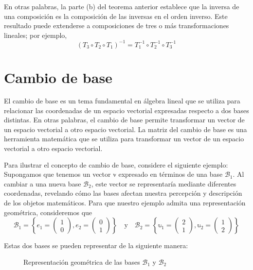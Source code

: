 En otras palabras, la parte (b) del teorema anterior establece que la inversa de una composición es la composición de las inversas en el orden inverso. Este resultado puede extenderse a composiciones de tres o más transformaciones lineales; por ejemplo,
$$(T_3 \circ T_2 \circ T_1)^{-1} = T_1^{-1} \circ T_2^{-1} \circ T_3^{-1}$$

\newpage

\section{Cambio de base}

El cambio de base es un tema fundamental en álgebra lineal que se utiliza para relacionar las coordenadas de un espacio vectorial expresadas respecto a dos bases distintas. En otras palabras, el cambio de base permite transformar un vector de un espacio vectorial a otro espacio vectorial. La matriz del cambio de base es una herramienta matemática que se utiliza para transformar un vector de un espacio vectorial a otro espacio vectorial.

Para ilustrar el concepto de cambio de base, considere el siguiente ejemplo: Supongamos que tenemos un vector $\mathbb{v}$ expresado en términos de una base $\mathcal{B}_1$. Al cambiar a una nueva base $\mathcal{B}_2$, este vector se representaría mediante diferentes coordenadas, revelando cómo las bases afectan nuestra percepción y descripción de los objetos matemáticos. Para que nuestro ejemplo admita una representación geométrica, consideremos que
$$\mathcal{B}_1 = \left\{ e_1 = \begin{pmatrix}
    1 \\
    0
\end{pmatrix},  e_2 = \begin{pmatrix}
    0 \\
    1
\end{pmatrix} \right\} \quad \text{y} \quad \mathcal{B}_2 = \left\{ \mathbb{u}_1 = \begin{pmatrix}
    2 \\
    1
\end{pmatrix},  \mathbb{u}_2 = \begin{pmatrix}
    1 \\
    2
\end{pmatrix} \right\}$$

Estas dos bases se pueden representar de la siguiente manera:
\begin{figure}[h!]
    \centering
    \caption{Representación geométrica de las bases $\mathcal{B}_1$ y $\mathcal{B}_2$}
\end{figure}

